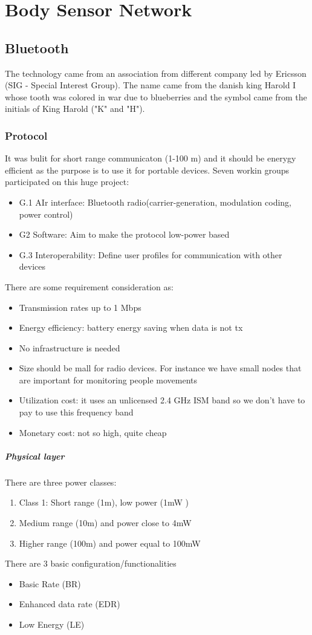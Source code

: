 \chapter{Body Sensor Network}
\section{Bluetooth}
The technology came from an association from different company led by Ericsson (SIG - Special Interest Group). The name came from the danish king Harold I whose tooth was colored in war due to blueberries and the symbol came from the initials of King Harold ("K" and "H").

\subsection{Protocol}
It was bulit for short range communicaton (1-100 m) and it should be enerygy efficient as the purpose is to use it for portable devices. Seven workin groups participated on this huge project:
\begin{itemize}
\item G.1 AIr interface: Bluetooth radio(carrier-generation, modulation coding, power control)
\item G2 Software: Aim to make the protocol low-power based
\item G.3 Interoperability: Define user profiles for communication with other devices
\end{itemize}
There are some requirement consideration as:
\begin{itemize}
\item Transmission rates up to 1 Mbps
\item Energy efficiency: battery energy saving when data is not tx
\item No infrastructure is needed
\item Size should be mall for radio devices. For instance we have small nodes that are important for monitoring people movements
\item Utilization cost: it uses an unlicensed 2.4 GHz ISM band so we don't have to pay to use this frequency band
\item Monetary cost: not so high, quite cheap
\end{itemize}

\paragraph{Physical layer}
There are three power classes:
\begin{enumerate}
\item Class 1: Short range (1m), low power (1mW )
\item Medium range (10m) and power close to 4mW
\item Higher range (100m) and power equal to 100mW
\end{enumerate}
There are 3 basic configuration/functionalities
\begin{itemize}
\item Basic Rate (BR)
\item Enhanced data rate (EDR)
\item Low Energy (LE)
\end{itemize}

